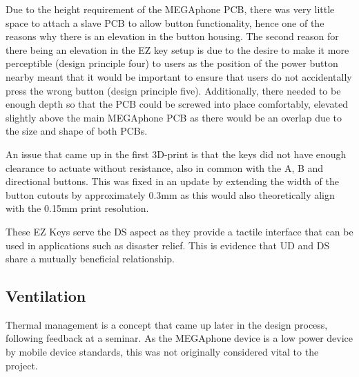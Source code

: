 Due to the height requirement of the MEGAphone PCB, there was very little space to attach a slave PCB to allow button functionality, hence one of the reasons why there is an elevation in the button housing.
The second reason for there being an elevation in the EZ key setup is due to the desire to make it more perceptible (design principle four) to users as the position of the power button nearby meant that it would be important to ensure that users do not accidentally press the wrong button (design principle five).
Additionally, there needed to be enough depth so that the PCB could be screwed into place comfortably, elevated slightly above the main MEGAphone PCB as there would be an overlap due to the size and shape of both PCBs.

An issue that came up in the first 3D-print is that the keys did not have enough clearance to actuate without resistance, also in common with the A, B and directional buttons.
This was fixed in an update by extending the width of the button cutouts by approximately 0.3mm as this would also theoretically align with the 0.15mm print resolution. %

These EZ Keys serve the DS aspect as they provide a tactile interface that can be used in applications such as disaster relief.
This is evidence that UD and DS share a mutually beneficial relationship.

\subsection{Ventilation}

Thermal management is a concept that came up later in the design process, following feedback at a seminar.
As the MEGAphone device is a low power device by mobile device standards, this was not originally considered vital to the project.

